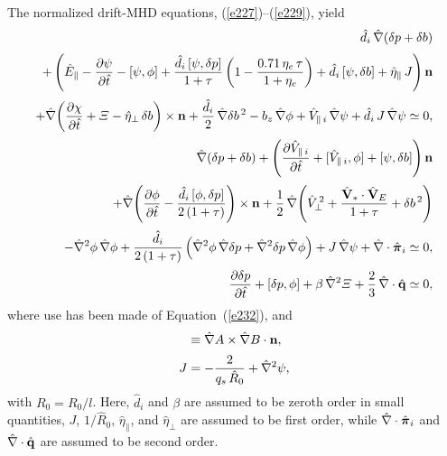 \documentclass[notitlepage,12pt]{article}
\newcommand{\bpi}{\mbox{\boldmath$\pi$}}
\begin{document}
 The normalized drift-MHD equations, (\ref{e227})--(\ref{e229}), yield 
 \begin{align}\label{e247}
 \hat{d}_i\,\hat{\nabla}(\delta p + \delta b)\nonumber\\[0.5ex]+ \left(\hat{E}_{\parallel}-\frac{\partial\psi}{\partial \hat{t}} - [\psi,\phi]+ \frac{\hat{d}_i\,[\psi,\delta p]}{1+\tau}\left(1-\frac{0.71\,\eta_e\,\tau}{1+\eta_e}\right)
 + \hat{d}_i\,[\psi,\delta b]+ \hat{\eta}_\parallel\,J\right){\bf n}\nonumber\\[0.5ex]
 +\hat{\nabla}\!\left(\frac{\partial\chi}{\partial \hat{t}} + {\mit\Xi} -\hat{\eta}_\perp\,\delta b\right)\times {\bf n} + \frac{\hat{d}_i}{2}\,\hat{\nabla}\delta b^{\,2}- b_z\,\hat{\nabla}\phi + \hat{V}_{\parallel\,i}\,\hat{\nabla}\psi
+  \hat{d}_i\,J\,\hat{\nabla}\psi \simeq 0,\\[0.5ex]
 \hat{\nabla}(\delta p + \delta b) + \left(\frac{\partial \hat{V}_{\parallel\,i}}{\partial \hat{t}} + [\hat{V}_{\parallel\,i},\phi] + [\psi,\delta b]\right){\bf n}\nonumber\\[0.5ex]
 +\hat{\nabla}\!\left(\frac{\partial\phi}{\partial \hat{t}} - \frac{\hat{d}_i\,[\phi,\delta p]}{2\,(1+\tau)}\right)\times {\bf n} 
 + \frac{1}{2}\,\hat{\nabla}\!
 \left(\hat{V}_\perp^{\,2}+ \frac{\hat{\bf V}_\ast\cdot\hat{\bf V}_E }{1+\tau}+ \delta b^{\,2}\right)  \nonumber\\[0.5ex]
-\hat{\nabla}^2\phi\,\hat{\nabla}\phi + \frac{\hat{d}_i}{2\,(1+\tau)}\left(\hat{\nabla}^2\phi\,\hat{\nabla}\delta p +\hat{\nabla}^2\delta p\,\hat{\nabla}\phi\right) + J\,\hat{\nabla}\psi + \hat{\nabla}\cdot\hat{\bpi}_i \simeq 0,\label{e248}\\[0.5ex]
\frac{\partial \delta p}{\partial \hat{t}} + [\delta p,\phi] +\beta\,\hat{\nabla}^2{\mit\Xi} + \frac{2}{3}\,\hat{\nabla}\cdot \hat{\bf q}\simeq 0,\label{e249}
 \end{align}
 where use has been made of Equation~(\ref{e232}), and
 \begin{align}
 [A,B] &\equiv \hat{\nabla} A\times \hat{\nabla} B\cdot{\bf n},\\[0.5ex]
 J &= -\frac{2}{q_s\,\hat{R}_0}+ \hat{\nabla}^2\psi,\label{eJ}
 \end{align}
 with $R_0=R_0/l$. 
 Here, $\hat{d}_i$ and $\beta$ are assumed to be zeroth order in small quantities, $J$, $1/\hat{R}_0$, $\hat{\eta}_\parallel$, and $\hat{\eta}_\perp$ are assumed to be first order, while $\hat{\nabla}\cdot \hat{\bpi}_{i}$ and $\hat{\nabla}\cdot\hat{\bf q}$ are assumed to be second order. 
 
\end{document}
